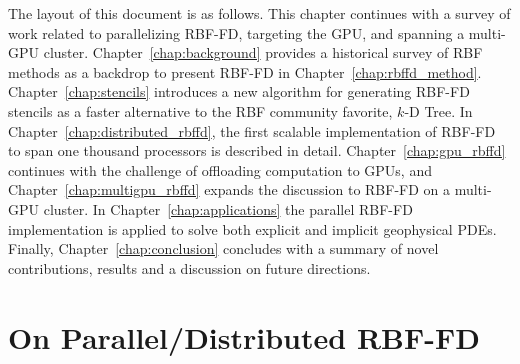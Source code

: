 \documentclass[11pt]{report}
\begin{document}
%
%
%
%



The layout of this document is as follows. This chapter continues with a survey of work related to parallelizing RBF-FD, targeting the GPU, and spanning a multi-GPU cluster. Chapter~\ref{chap:background} provides a historical survey of RBF methods as a backdrop to present RBF-FD in Chapter~\ref{chap:rbffd_method}. Chapter~\ref{chap:stencils} introduces a new algorithm for generating RBF-FD stencils as a faster alternative to the RBF community favorite, $k$-D Tree. In Chapter~\ref{chap:distributed_rbffd}, the first scalable implementation of RBF-FD to span one thousand processors is described in detail. Chapter~\ref{chap:gpu_rbffd} continues with the challenge of offloading computation to GPUs, and Chapter~\ref{chap:multigpu_rbffd} expands the discussion to RBF-FD on a multi-GPU cluster. In Chapter~\ref{chap:applications} the parallel RBF-FD implementation is applied to solve both explicit and implicit geophysical PDEs. Finally, Chapter~\ref{chap:conclusion} concludes with a summary of novel contributions, results and a discussion on future directions.

\section{On Parallel/Distributed RBF-FD} 
\end{document}

